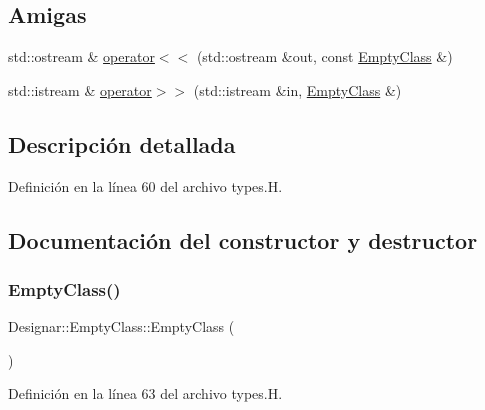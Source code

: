 \subsection*{Amigas}
\begin{DoxyCompactItemize}
\item 
std\+::ostream \& \hyperlink{class_designar_1_1_empty_class_a1927797e0167a693cd74b5227218f196}{operator$<$$<$} (std\+::ostream \&out, const \hyperlink{class_designar_1_1_empty_class}{Empty\+Class} \&)
\item 
std\+::istream \& \hyperlink{class_designar_1_1_empty_class_aa3fc576ae898cf56f66f6ebf12251803}{operator$>$$>$} (std\+::istream \&in, \hyperlink{class_designar_1_1_empty_class}{Empty\+Class} \&)
\end{DoxyCompactItemize}


\subsection{Descripción detallada}


Definición en la línea 60 del archivo types.\+H.



\subsection{Documentación del constructor y destructor}
\mbox{\label{class_designar_1_1_empty_class_a88d846866a1e4872224ec2b4e750eba8}} 
\subsubsection{\texorpdfstring{Empty\+Class()}{EmptyClass()}\hspace{0.1cm}{\footnotesize\ttfamily [1/3]}}
{\footnotesize\ttfamily Designar\+::\+Empty\+Class\+::\+Empty\+Class (\begin{DoxyParamCaption}{ }\end{DoxyParamCaption})\hspace{0.3cm}{\ttfamily [inline]}}



Definición en la línea 63 del archivo types.\+H.

\mbox{\label{class_designar_1_1_empty_class_a0a0b2cec90aebb02e6f5e3371087b221}} 
